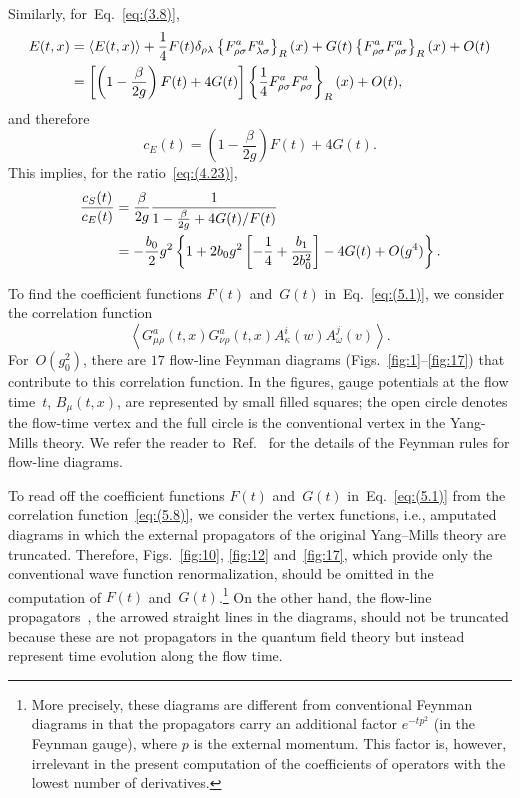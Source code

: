 Similarly, for~Eq.~\eqref{eq:(3.8)},
\begin{align}
   E(t,x)
   &=\left\langle E(t,x)\right\rangle
   +\frac{1}{4}F(t)\delta_{\rho\lambda}
   \left\{F_{\rho\sigma}^aF_{\lambda\sigma}^a\right\}_R(x)
   +G(t)\left\{F_{\rho\sigma}^aF_{\rho\sigma}^a\right\}_R(x)
   +O(t)
\notag\\
   &=\left[
   \left(1-\frac{\beta}{2g}\right)F(t)+4G(t)\right]
   \left\{\frac{1}{4}F_{\rho\sigma}^aF_{\rho\sigma}^a\right\}_R(x)
   +O(t),
\label{eq:(5.5)}
\end{align}
and therefore
\begin{equation}
   c_E(t)=\left(1-\frac{\beta}{2g}\right)F(t)+4G(t).
\label{eq:(5.6)}
\end{equation}
This implies, for the ratio~\eqref{eq:(4.23)},
\begin{align}
   \frac{c_S(t)}{c_E(t)}
   &=\frac{\beta}{2g}\frac{1}{1-\frac{\beta}{2g}+4G(t)/F(t)}
\notag\\
   &=-\frac{b_0}{2}g^2
   \left\{1+2b_0g^2\left[-\frac{1}{4}+\frac{b_1}{2b_0^2}\right]
   -4G(t)+O(g^4)\right\}.
\label{eq:(5.7)}
\end{align}

To find the coefficient functions $F(t)$ and~$G(t)$ in~Eq.~\eqref{eq:(5.1)}, we
consider the correlation function
\begin{equation}
   \left\langle G_{\mu\rho}^a(t,x)G_{\nu\rho}^a(t,x)
   A_\kappa^i(w)A_\omega^j(v)\right\rangle.
\label{eq:(5.8)}
\end{equation}
For~$O(g_0^2)$, there are $17$ flow-line Feynman diagrams
(Figs.~\ref{fig:1}--\ref{fig:17}) that contribute to this correlation function.
In the figures, gauge potentials at the flow time~$t$, $B_\mu(t,x)$, are
represented by small filled squares; the open circle denotes the flow-time
vertex and the full circle is the conventional vertex in the Yang-Mills theory.
We refer the reader to~Ref.~\cite{Luscher:2011bx} for the details of the
Feynman rules for flow-line diagrams.

To read off the coefficient functions $F(t)$ and~$G(t)$ in~Eq.~\eqref{eq:(5.1)}
from the correlation function~\eqref{eq:(5.8)}, we consider the vertex
functions, i.e., amputated diagrams in which the external propagators of the
original Yang--Mills theory are truncated. Therefore, Figs.~\ref{fig:10},
\ref{fig:12} and~\ref{fig:17}, which provide only the conventional wave
function renormalization, should be omitted in the computation of $F(t)$
and~$G(t)$.\footnote{More precisely, these diagrams are different from
conventional Feynman diagrams in that the propagators carry an additional
factor $e^{-tp^2}$ (in the Feynman gauge), where $p$ is the external momentum.
This factor is, however, irrelevant in the present computation of the
coefficients of operators with the lowest number of derivatives.} On the other
hand, the flow-line propagators~\cite{Luscher:2011bx}, the arrowed straight
lines in the diagrams, should not be truncated because these are not
propagators in the quantum field theory but instead represent time evolution
along the flow time.

